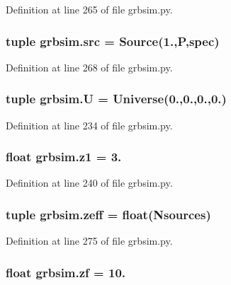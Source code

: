 Definition at line 265 of file grbsim.\-py.

\hypertarget{namespacegrbsim_af976d314256398df4c23c6ef57c3a459}{
\subsubsection[{src}]{\setlength{\rightskip}{0pt plus 5cm}tuple grbsim.\-src = {\bf Source}(1.,{\bf P},{\bf spec})}}\label{namespacegrbsim_af976d314256398df4c23c6ef57c3a459}


Definition at line 268 of file grbsim.\-py.

\hypertarget{namespacegrbsim_aa8175e808cca57d0b43c3f360b6a2c8b}{
\subsubsection[{U}]{\setlength{\rightskip}{0pt plus 5cm}tuple grbsim.\-U = {\bf Universe}(0.,0.,0.,0.)}}\label{namespacegrbsim_aa8175e808cca57d0b43c3f360b6a2c8b}


Definition at line 234 of file grbsim.\-py.

\hypertarget{namespacegrbsim_aba9a7720313a09fb6252d13deeb5098b}{
\subsubsection[{z1}]{\setlength{\rightskip}{0pt plus 5cm}float grbsim.\-z1 = 3.}}\label{namespacegrbsim_aba9a7720313a09fb6252d13deeb5098b}


Definition at line 240 of file grbsim.\-py.

\hypertarget{namespacegrbsim_a3ccaa74e7ed0d8956078990201ccdbe4}{
\subsubsection[{zeff}]{\setlength{\rightskip}{0pt plus 5cm}tuple grbsim.\-zeff = float({\bf Nsources})}}\label{namespacegrbsim_a3ccaa74e7ed0d8956078990201ccdbe4}


Definition at line 275 of file grbsim.\-py.

\hypertarget{namespacegrbsim_a020eec795706880dd65d924032f26397}{
\subsubsection[{zf}]{\setlength{\rightskip}{0pt plus 5cm}float grbsim.\-zf = 10.}}\label{namespacegrbsim_a020eec795706880dd65d924032f26397}


